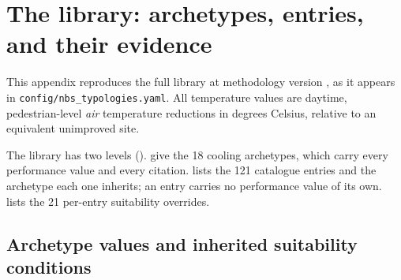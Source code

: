 \section{The library: archetypes, entries, and their evidence}
\label{app:typologies}

This appendix reproduces the full library at methodology version
\methver{}, as it appears in \texttt{config/nbs\_typologies.yaml}. All
temperature values are daytime, pedestrian-level \emph{air} temperature
reductions in degrees Celsius, relative to an equivalent unimproved site.

The library has two levels ().  give the \num{18} cooling
archetypes, which carry every performance value and every citation.
 lists the \num{121} catalogue entries and the archetype
each one inherits; an entry carries no performance value of its own.
 lists the \num{21} per-entry suitability overrides.

\subsection{Archetype values and inherited suitability conditions}

